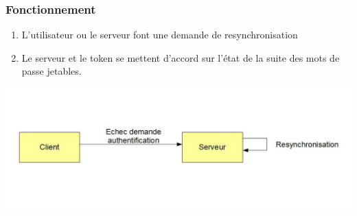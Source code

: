 \documentclass{"../../res/univ-projet"}
\begin{document}
\subsubsection{Fonctionnement}
\begin{enumerate}
    \item L'utilisateur ou le serveur font une demande de resynchronisation
    \item Le serveur et le token se mettent d'accord sur l'état de la suite des
    mots de passe jetables.
\end{enumerate}
\includegraphics[width=\textwidth]{../resynchronisation.jpg}
\end{document}

